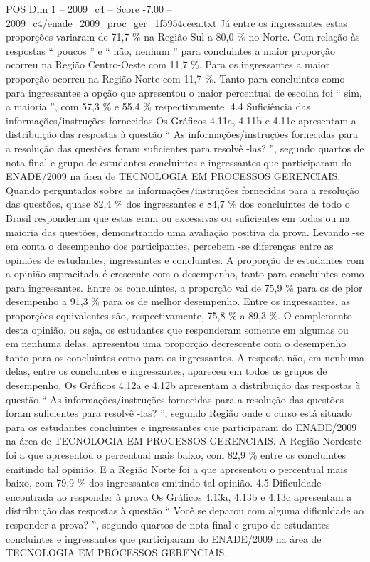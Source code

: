 \begin{textsample}{POS Dim 1 – 2009\_c4 – Score -7.00 – 2009\_c4/enade\_2009\_proc\_ger\_1f5954ceea.txt}
Já entre os ingressantes estas proporções variaram de 71,7 \% na Região Sul a 80,0 \% no Norte.
Com relação às respostas “ poucos ” e “ não, nenhum ” para concluintes a maior proporção ocorreu na Região Centro-Oeste com 11,7 \%.
Para os ingressantes a maior proporção ocorreu na Região Norte com 11,7 \%.
Tanto para concluintes como para ingressantes a opção que apresentou o maior percentual de escolha foi “ sim, a maioria ”, com 57,3 \% e 55,4 \% respectivamente. 4.4 Suficiência das informações/instruções fornecidas Os Gráficos 4.11a, 4.11b e 4.11c apresentam a distribuição das respostas à questão “ As informações/instruções fornecidas para a resolução das questões foram suficientes para resolvê -las? ”, segundo quartos de nota final e grupo de estudantes concluintes e ingressantes que participaram do ENADE/2009 na área de TECNOLOGIA EM PROCESSOS GERENCIAIS.
Quando perguntados sobre as informações/instruções fornecidas para a resolução das questões, quase 82,4 \% dos ingressantes e 84,7 \% dos concluintes de todo o Brasil responderam que estas eram ou excessivas ou suficientes em todas ou na maioria das questões, demonstrando uma avaliação positiva da prova.
Levando -se em conta o desempenho dos participantes, percebem -se diferenças entre as opiniões de estudantes, ingressantes e concluintes.
A proporção de estudantes com a opinião supracitada é crescente com o desempenho, tanto para concluintes como para ingressantes.
Entre os concluintes, a proporção vai de 75,9 \% para os de pior desempenho a 91,3 \% para os de melhor desempenho.
Entre os ingressantes, as proporções equivalentes são, respectivamente, 75,8 \% a 89,3 \%.
O complemento desta opinião, ou seja, os estudantes que responderam somente em algumas ou em nenhuma delas, apresentou uma proporção decrescente com o desempenho tanto para os concluintes como para os ingressantes.
A resposta não, em nenhuma delas, entre os concluintes e ingressantes, apareceu em todos os grupos de desempenho.
Os Gráficos 4.12a e 4.12b apresentam a distribuição das respostas à questão “ As informações/instruções fornecidas para a resolução das questões foram suficientes para resolvê -las? ”, segundo Região onde o curso está situado para os estudantes concluintes e ingressantes que participaram do ENADE/2009 na área de TECNOLOGIA EM PROCESSOS GERENCIAIS.
A Região Nordeste foi a que apresentou o percentual mais baixo, com 82,9 \% entre os concluintes emitindo tal opinião.
E a Região Norte foi a que apresentou o percentual mais baixo, com 79,9 \% dos ingressantes emitindo tal opinião. 4.5 Dificuldade encontrada ao responder à prova Os Gráficos 4.13a, 4.13b e 4.13c apresentam a distribuição das respostas à questão “ Você se deparou com alguma dificuldade ao responder a prova? ”, segundo quartos de nota final e grupo de estudantes concluintes e ingressantes que participaram do ENADE/2009 na área de TECNOLOGIA EM PROCESSOS GERENCIAIS.

\end{textsample}
